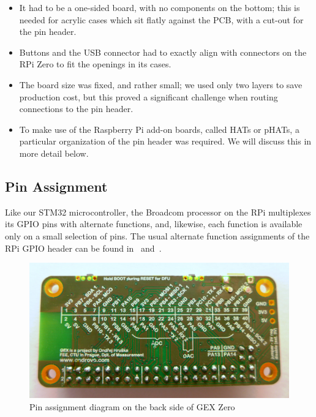 \begin{itemize}
	\item It had to be a one-sided board, with no components on the bottom; this is needed for acrylic cases which sit flatly against the \gls{PCB}, with a cut-out for the pin header.
	\item Buttons and the USB connector had to exactly align with connectors on the RPi Zero to fit the openings in its cases.
	\item The board size was fixed, and rather small; we used only two layers to save production cost, but this proved a significant challenge when routing connections to the pin header.
	\item To make use of the Raspberry Pi add-on boards, called HATs or pHATs, a particular organization of the pin header was required. We will discuss this in more detail below.
\end{itemize}

\subsection{Pin Assignment}

Like our STM32 microcontroller, the Broadcom processor on the RPi multiplexes its \gls{GPIO} pins with alternate functions, and, likewise, each function is available only on a small selection of pins. The usual alternate function assignments of the RPi \gls{GPIO} header can be found in~\cite{piheader} and~\cite{piheaderxyz}.

\begin{figure}[h]
	\centering
	\includegraphics[width=.85\textwidth]{img/photo-zero-naked-bottom.jpg}
	\caption[GEX Zero back side]{\label{fig:gexz}Pin assignment diagram on the back side of GEX Zero}
\end{figure}

